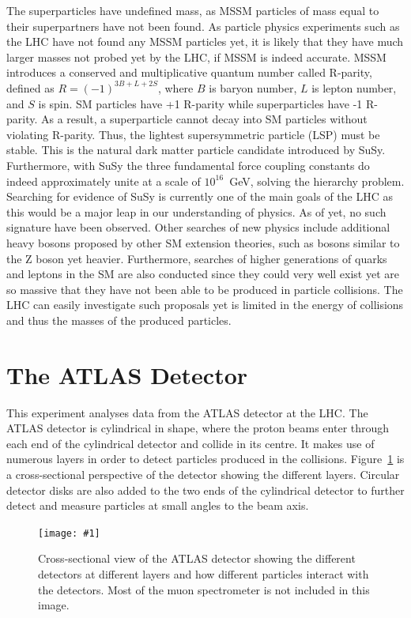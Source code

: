 \documentclass[twocolumn]{article}
\newcommand{\insertFigure}[1]{%
   \texttt{[image: \#1]}%
}
\begin{document}
The superparticles have undefined mass, as MSSM particles of mass equal to their superpartners have not been found. As particle physics experiments such as the LHC have not found any MSSM particles yet, it is likely that they have much larger masses not probed yet by the LHC, if MSSM is indeed accurate. MSSM introduces a conserved and multiplicative quantum number called R-parity, defined as $R = (-1)^{3B+L+2S}$, where $B$ is baryon number, $L$ is lepton number, and $S$ is spin. SM particles have +1 R-parity while superparticles have -1 R-parity. As a result, a superparticle cannot decay into SM particles without violating R-parity. Thus, the lightest supersymmetric particle (LSP) must be stable. This is the natural dark matter particle candidate introduced by SuSy. Furthermore, with SuSy the three fundamental force coupling constants do indeed approximately unite at a scale of $10^{16}$~GeV, solving the hierarchy problem. Searching for evidence of SuSy is currently one of the main goals of the LHC as this would be a major leap in our understanding of physics. As of yet, no such signature have been observed. Other searches of new physics include additional heavy bosons proposed by other SM extension theories, such as bosons similar to the Z boson yet heavier. Furthermore, searches of higher generations of quarks and leptons in the SM are also conducted since they could very well exist yet are so massive that they have not been able to be produced in particle collisions. The LHC can easily investigate such proposals yet is limited in the energy of collisions and thus the masses of the produced particles.

\section{The ATLAS Detector}\label{sec:Exp}
This experiment analyses data from the ATLAS detector at the LHC. The ATLAS detector is cylindrical in shape, where the proton beams enter through each end of the cylindrical detector and collide in its centre. It makes use of numerous layers in order to detect particles produced in the collisions. Figure~\ref{fig:ATLAS} is a cross-sectional perspective of the detector showing the different layers. Circular detector disks are also added to the two ends of the cylindrical detector to further detect and measure particles at small angles to the beam axis.
\begin{figure}[!h]
	\centering
	\insertFigure{Images/ATLAS.png}
	\caption{Cross-sectional view of the ATLAS detector showing the different detectors at different layers and how different particles interact with the detectors. Most of the muon spectrometer is not included in this image.~\cite{manual}}
	\label{fig:ATLAS}
\end{figure}
\end{document}
